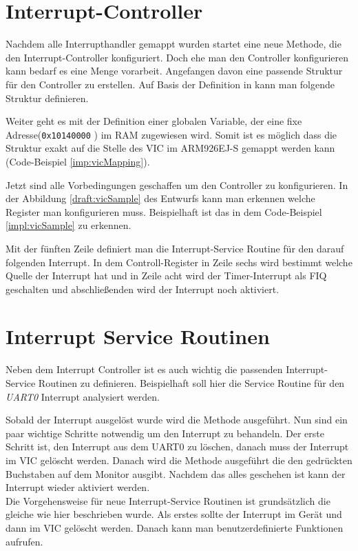 \section{Interrupt-Controller}
Nachdem alle Interrupthandler gemappt wurden startet eine neue Methode, die den Interrupt-Controller konfiguriert. Doch ehe man den Controller konfigurieren kann bedarf es eine Menge vorarbeit. Angefangen davon eine passende Struktur f\"ur den Controller zu erstellen. Auf Basis der Definition in \cite[35]{vic} kann man folgende Struktur definieren.

Weiter geht es mit der Definition einer globalen Variable, der eine fixe Adresse(\texttt{0x10140000} \parencite[vgl. Tabelle 4-37][223]{archManI}) im RAM zugewiesen wird. Somit ist es m\"oglich dass die Struktur exakt auf die Stelle des VIC im ARM926EJ-S gemappt werden kann (Code-Beispiel \ref{imp:vicMapping}). 

Jetzt sind alle Vorbedingungen geschaffen um den Controller zu konfigurieren. In der Abbildung \ref{draft:vicSample} des Entwurfs kann man erkennen welche Register man konfigurieren muss. Beispielhaft ist das in dem Code-Beispiel  \ref{impl:vicSample} zu erkennen.

Mit der f\"unften Zeile definiert man die Interrupt-Service Routine f\"ur den darauf folgenden Interrupt. In dem Controll-Register in Zeile sechs wird bestimmt welche Quelle der Interrupt hat und in Zeile acht wird der Timer-Interrupt als FIQ geschalten und abschlie\ss enden wird der Interrupt noch aktiviert.
\section{Interrupt Service Routinen}
Neben dem Interrupt Controller ist es auch wichtig die passenden Interrupt-Service Routinen zu definieren. Beispielhaft soll hier die Service Routine f\"ur den \textit{UART0} Interrupt analysiert werden. 

Sobald der Interrupt ausgel\"ost wurde wird die Methode ausgef\"uhrt. Nun sind ein paar wichtige Schritte notwendig um den Interrupt zu behandeln. Der erste Schritt ist, den Interrupt aus dem UART0 zu l\"oschen, danach muss der Interrupt im VIC gel\"oscht werden. Danach wird die Methode ausgef\"uhrt die den gedr\"uckten Buchstaben auf dem Monitor ausgibt.
Nachdem das alles geschehen ist kann der Interrupt wieder aktiviert werden.\\
Die Vorgehensweise f\"ur neue Interrupt-Service Routinen ist grunds\"atzlich die gleiche wie hier beschrieben wurde. Als erstes sollte der Interrupt im Ger\"at und dann im VIC gel\"oscht werden. Danach kann man benutzerdefinierte Funktionen aufrufen.
